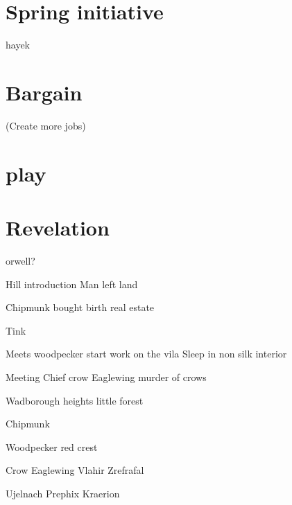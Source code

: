 \documentclass[smalldemyvopaper,11pt,twoside,onecolumn,openright,extrafontsizes]{memoir}
\begin{document}
\chapter{Spring initiative}

hayek

\chapter{Bargain}


(Create more jobs)

\chapter{play}


\chapter{Revelation}
orwell?

 Hill introduction Man left land

 Chipmunk bought birth real estate
 
 Tink

 Meets woodpecker start work on the vila
 Sleep in non silk interior

Meeting Chief crow Eaglewing murder of crows

Wadborough heights little forest 

Chipmunk 

Woodpecker 
red crest

Crow Eaglewing
Vlahir
Zrefrafal

Ujelnach
Prephix
Kraerion


\end{document}
